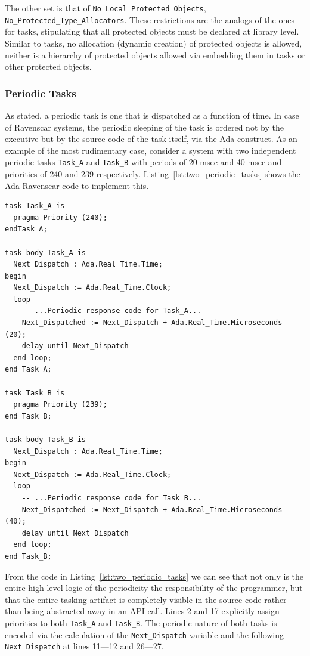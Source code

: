 The other set is that of \texttt{No\_Local\_Protected\_Objects},
\texttt{No\_Protected\_Type\_Allocators}. These restrictions are the
analogs of the ones for tasks, stipulating that all protected objects
must be declared at library level. Similar to tasks, no allocation
(dynamic creation) of protected objects is allowed, neither is a
hierarchy of protected objects allowed via embedding them in tasks or
other protected objects.

\subsubsection{Periodic Tasks}
As stated, a periodic task is one that is dispatched as a function of time. In
case of Ravenscar systems, the periodic sleeping of the task is
ordered not by the executive but by the source code of the task
itself, via the  Ada construct. As an example of the
most rudimentary case, consider a system with two independent periodic
tasks \texttt{Task\_A} and \texttt{Task\_B} with periods of 20 msec
and 40 msec and priorities of 240 and 239
respectively. Listing~\ref{lst:two_periodic_tasks} shows the Ada
Ravenscar code to implement this.
\begin{minipage}{\listingwidth}
\lstset{language=ada,
  numbers=left,
  numberstyle=\tiny
}
\begin{lstlisting}[firstnumber=1, label=lst:two_periodic_tasks,
    caption=Two Ravenscar periodic tasks with periods of 20 msec and
    40 msec and priorities of 240 and 239.]
task Task_A is 
  pragma Priority (240);
endTask_A;

task body Task_A is
  Next_Dispatch : Ada.Real_Time.Time;
begin
  Next_Dispatch := Ada.Real_Time.Clock;
  loop
    -- ...Periodic response code for Task_A...
    Next_Dispatched := Next_Dispatch + Ada.Real_Time.Microseconds (20);
    delay until Next_Dispatch
  end loop;
end Task_A;

task Task_B is
  pragma Priority (239);
end Task_B;

task body Task_B is
  Next_Dispatch : Ada.Real_Time.Time;
begin
  Next_Dispatch := Ada.Real_Time.Clock;
  loop
    -- ...Periodic response code for Task_B...
    Next_Dispatched := Next_Dispatch + Ada.Real_Time.Microseconds (40);
    delay until Next_Dispatch
  end loop;
end Task_B;
\end{lstlisting}
\end{minipage}

From the code in Listing~\ref{lst:two_periodic_tasks} we can see that
not only is the entire high-level logic of the periodicity the
responsibility of the programmer, but that the entire tasking artifact
is completely visible in the source code rather than being abstracted
away in an API call. Lines 2 and 17 explicitly assign priorities to
both \texttt{Task\_A} and \texttt{Task\_B}. The periodic nature of
both tasks is encoded via the calculation of the
\texttt{Next\_Dispatch} variable and the following 
\texttt{Next\_Dispatch} at lines 11---12 and 26---27.

